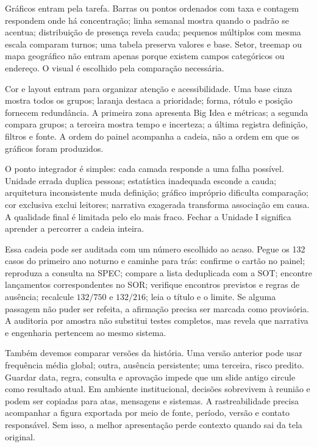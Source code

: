 Gráficos entram pela tarefa. Barras ou pontos ordenados com taxa e contagem respondem onde há concentração; linha semanal mostra quando o padrão se acentua; distribuição de presença revela cauda; pequenos múltiplos com mesma escala comparam turnos; uma tabela preserva valores e base. Setor, treemap ou mapa geográfico não entram apenas porque existem campos categóricos ou endereço. O visual é escolhido pela comparação necessária.

Cor e layout entram para organizar atenção e acessibilidade. Uma base cinza mostra todos os grupos; laranja destaca a prioridade; forma, rótulo e posição fornecem redundância. A primeira zona apresenta Big Idea e métricas; a segunda compara grupos; a terceira mostra tempo e incerteza; a última registra definição, filtros e fonte. A ordem do painel acompanha a cadeia, não a ordem em que os gráficos foram produzidos.

O ponto integrador é simples: cada camada responde a uma falha possível. Unidade errada duplica pessoas; estatística inadequada esconde a cauda; arquitetura inconsistente muda definição; gráfico impróprio dificulta comparação; cor exclusiva exclui leitores; narrativa exagerada transforma associação em causa. A qualidade final é limitada pelo elo mais fraco. Fechar a Unidade I significa aprender a percorrer a cadeia inteira.

Essa cadeia pode ser auditada com um número escolhido ao acaso. Pegue os 132 casos do primeiro ano noturno e caminhe para trás: confirme o cartão no painel; reproduza a consulta na SPEC; compare a lista deduplicada com a SOT; encontre lançamentos correspondentes no SOR; verifique encontros previstos e regras de ausência; recalcule $132/750$ e $132/216$; leia o título e o limite. Se alguma passagem não puder ser refeita, a afirmação precisa ser marcada como provisória. A auditoria por amostra não substitui testes completos, mas revela que narrativa e engenharia pertencem ao mesmo sistema.

Também devemos comparar versões da história. Uma versão anterior pode usar frequência média global; outra, ausência persistente; uma terceira, risco predito. Guardar data, regra, consulta e aprovação impede que um slide antigo circule como resultado atual. Em ambiente institucional, decisões sobrevivem à reunião e podem ser copiadas para atas, mensagens e sistemas. A rastreabilidade precisa acompanhar a figura exportada por meio de fonte, período, versão e contato responsável. Sem isso, a melhor apresentação perde contexto quando sai da tela original.

